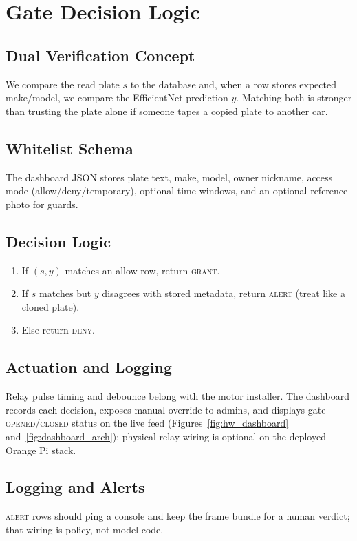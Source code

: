 \documentclass[10pt, conference]{IEEEtran}
\begin{document}
\section{Gate Decision Logic}
\label{sec:gate}
\subsection{Dual Verification Concept}
We compare the read plate $s$ to the database and, when a row stores expected make/model, we compare the EfficientNet prediction $y$. Matching both is stronger than trusting the plate alone if someone tapes a copied plate to another car.

\subsection{Whitelist Schema}
The dashboard JSON stores plate text, make, model, owner nickname, access mode (allow/deny/temporary), optional time windows, and an optional reference photo for guards.

\subsection{Decision Logic}
\begin{enumerate}[label=\arabic*.,leftmargin=*]
  \item If $(s,y)$ matches an allow row, return \textsc{grant}.
  \item If $s$ matches but $y$ disagrees with stored metadata, return \textsc{alert} (treat like a cloned plate).
  \item Else return \textsc{deny}.
\end{enumerate}

\subsection{Actuation and Logging}
Relay pulse timing and debounce belong with the motor installer. The dashboard records each decision, exposes manual override to admins, and displays gate \textsc{opened}/\textsc{closed} status on the live feed (Figures~\ref{fig:hw_dashboard} and~\ref{fig:dashboard_arch}); physical relay wiring is optional on the deployed Orange Pi stack.

\subsection{Logging and Alerts}
\textsc{alert} rows should ping a console and keep the frame bundle for a human verdict; that wiring is policy, not model code.
\end{document}
